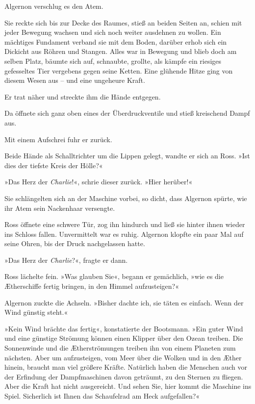 \bigpar

Algernon verschlug es den Atem.

Sie reckte sich bis zur Decke des Raumes, stieß an beiden Seiten
an, schien mit jeder Bewegung wachsen und sich noch weiter
ausdehnen zu wollen. Ein mächtiges Fundament verband sie mit dem
Boden, darüber erhob sich ein Dickicht aus Röhren und Stangen.
Alles war in Bewegung und blieb doch am selben Platz, bäumte sich
auf, schnaubte, grollte, als kämpfe ein riesiges gefesseltes Tier
vergebens gegen seine Ketten. Eine glühende Hitze ging von diesem
Wesen aus – und eine ungeheure Kraft.

Er trat näher und streckte ihm die Hände entgegen.

Da öffnete sich ganz oben eines der Überdruckventile und stieß
kreischend Dampf aus.

Mit einem Aufschrei fuhr er zurück.

Beide Hände als Schalltrichter um die Lippen gelegt, wandte er sich
an Ross. »Ist dies der tiefste Kreis der Hölle?«

»Das Herz der \textit{Charlie}!«, schrie dieser zurück. »Hier herüber!«

Sie schlängelten sich an der Maschine vorbei, so dicht, dass
Algernon spürte, wie ihr Atem sein Nackenhaar versengte.

Ross öffnete eine schwere Tür, zog ihn hindurch und ließ sie hinter
ihnen wieder ins Schloss fallen. Unvermittelt war es ruhig.
Algernon klopfte ein paar Mal auf seine Ohren, bis der Druck
nachgelassen hatte.

»Das Herz der \textit{Charlie}?«, fragte er dann.

Ross lächelte fein. »Was glauben Sie«, begann er gemächlich, »wie
es die Ætherschiffe fertig bringen, in den Himmel aufzusteigen?«

Algernon zuckte die Achseln. »Bisher dachte ich, sie täten es
einfach. Wenn der Wind günstig steht.«

»Kein Wind brächte das fertig«, konstatierte der Bootsmann. »Ein
guter Wind und eine günstige Strömung können einen Klipper über den
Ozean treiben. Die Sonnenwinde und die Ætherströmungen treiben ihn
von einem Planeten zum nächsten. Aber um aufzusteigen, vom Meer
über die Wolken und in den Æther hinein, braucht man viel größere
Kräfte. Natürlich haben die Menschen auch vor der Erfindung der
Dampfmaschinen davon geträumt, zu den Sternen zu fliegen. Aber die
Kraft hat nicht ausgereicht. Und sehen Sie, hier kommt die Maschine
ins Spiel. Sicherlich ist Ihnen das Schaufelrad am Heck
aufgefallen?«

